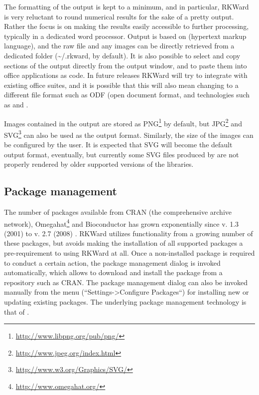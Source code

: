 The formatting of the output is kept to a minimum, and in particular,
RKWard is very reluctant to round numerical results for the sake of a
pretty output. Rather the focus is on making the results easily
accessible to further processing, typically in a dedicated word
processor. Output is based on
 (hypertext markup language), and the raw
 file and any images can be directly
retrieved from a dedicated folder
(\~{}/.rkward, by default). It is also
possible to select and copy sections of the output directly from the
output window, and to paste them into office applications as
 code. In future releases RKWard will
try to integrate with existing office suites, and it is possible that
this will also mean changing to a different file format such as ODF (open
document format, and technologies such as  and 
\citep{Leisch2002, Kuhn2006}.

Images contained in the output are stored as
PNG\footnote{\url{http://www.libpng.org/pub/png/}} by
default, but JPG\footnote{\url{http://www.jpeg.org/index.html}} and
SVG\footnote{\url{http://www.w3.org/Graphics/SVG/}}
can also be used as the output format. Similarly, the size of the
images can be configured by the user. It is expected that SVG will
become the default output format, eventually, but currently some SVG
files produced by  are not properly
rendered by older supported versions of the
 libraries.

\subsection{Package management}
\label{sec:package_management}
The number of  packages available from CRAN (the comprehensive  archive
network), Omegahat\footnote{\url{http://www.omegahat.org/}} and Bioconductor \citep{Gentleman2004} has grown exponentially since  v. 1.3
(2001) to  v. 2.7 (2008) \citep{Fox2008, Ligges2003, Visne2009}. RKWard
utilizes functionality from a growing number of these packages, but avoids
making the installation of all supported packages a pre-requirement to using
RKWard at all. Once a non-installed package is required to conduct a certain
action, the package management dialog is invoked automatically, which allows to
download and install the package from a repository such as CRAN. The package
management dialog can also be invoked manually from the menu
(``Settings->Configure Packages``) for installing new or updating existing 
packages. The underlying package management technology is that of 
\citep{Ligges2003, Ripley2005}.

